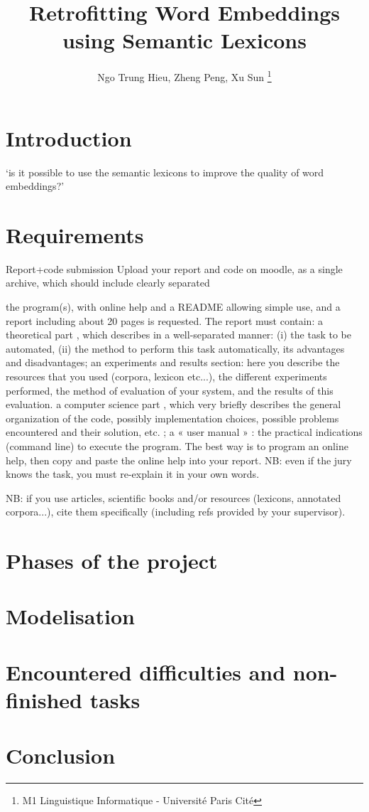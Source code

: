\documentclass[12pt]{article}
\title{Retrofitting Word Embeddings using Semantic Lexicons}
\author{Ngo Trung Hieu, Zheng Peng, Xu Sun \thanks{M1 Linguistique Informatique - Université Paris Cité}}
\date{}
\begin{document}
\maketitle

\section{Introduction}
`is it possible to use the semantic lexicons to improve the quality of word embeddings?'
\section{Requirements}
Report+code submission
Upload your report and code on moodle, as a single archive, which should include clearly separated

the program(s), with online help and a README allowing simple use,
and a report including about 20 pages is requested.
The report must contain:
a theoretical part , which describes in a well-separated manner: (i) the task to be automated, (ii) the method to perform this task automatically, its advantages and disadvantages;
an experiments and results section: here you describe the resources that you used (corpora, lexicon etc...), the different experiments performed, the method of evaluation of your system, and the results of this evaluation. 
a computer science part , which very briefly describes the general organization of the code, possibly implementation choices, possible problems encountered and their solution, etc. ;
a « user manual » : the practical indications (command line) to execute the program. The best way is to program an online help, then copy and paste the online help into your report.
NB: even if the jury knows the task, you must re-explain it in your own words.

NB: if you use articles, scientific books and/or resources (lexicons, annotated corpora...), cite them specifically (including refs provided by your supervisor).
\section{Phases of the project}

\section{Modelisation}

\section{Encountered difficulties and non-finished tasks}

\section{Conclusion}
\end{document}
